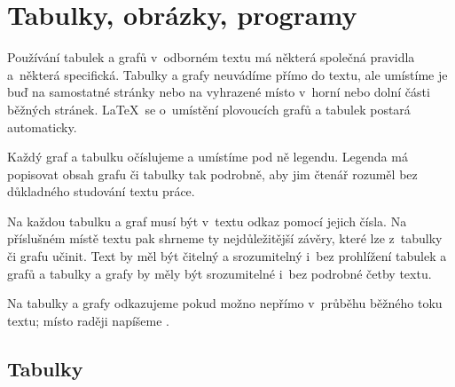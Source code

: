 
\chapter{Tabulky, obrázky, programy}

Používání tabulek a grafů v~odborném textu má některá společná
pravidla a~některá specifická. Tabulky a grafy neuvádíme přímo do
textu, ale umístíme je buď na samostatné stránky nebo na vyhrazené
místo v~horní nebo dolní části běžných stránek. \LaTeX\ se o~umístění
plovoucích grafů a tabulek postará automaticky.

Každý graf a tabulku
očíslujeme a umístíme pod ně legendu. Legenda má popisovat obsah grafu
či tabulky tak podrobně, aby jim čtenář rozuměl bez důkladného
studování textu práce.

Na každou tabulku a graf musí být v~textu odkaz
pomocí jejich čísla. Na příslušném místě textu pak shrneme ty
nejdůležitější závěry, které lze z~tabulky či grafu učinit. Text by
měl být čitelný a srozumitelný i~bez prohlížení tabulek a grafů a
tabulky a grafy by měly být srozumitelné i~bez podrobné četby textu.

Na tabulky a grafy odkazujeme pokud možno nepřímo v~průběhu běžného
toku textu; místo \emph{} raději napíšeme
\emph{}.


\section{Tabulky}

